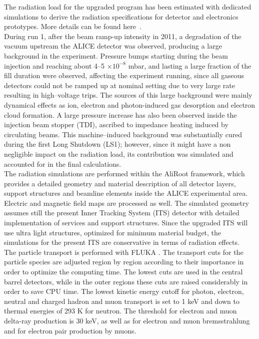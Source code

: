The radiation load for the upgraded program has been estimated with dedicated simulations to derive the radiation specifications for detector and electronics prototypes. More details can be found here~\cite{RadNote}.\\
During {\sc run} 1, after the beam ramp-up intensity in 2011, a degradation of the vacuum upstream the ALICE detector was observed, producing a large background in the experiment. Pressure bumps starting during the beam injection and reaching about 4--5 $\times 10^{-8}$ mbar, and lasting a large fraction of the fill duration were observed, affecting the experiment running, since all gaseous detectors could not be ramped up at nominal setting due to very large rate resulting in high--voltage trips. 
The sources of this large background were mainly dynamical effects as ion, electron and photon-induced gas desorption and electron cloud formation. A large pressure increase has also been observed inside the injection beam stopper (TDI), ascribed to impedance heating induced by circulating beams.
This machine--induced background was substantially cured during the first Long Shutdown (LS1); however, since it might have a non negligible impact on the radiation load, its contribution was simulated and accounted for in the final calculations.\\
The radiation simulations are performed within the AliRoot \cite{AliRoot} framework, which provides a detailed geometry and material description of all detector layers, support structures and beamline elements inside the ALICE experimental area. Electric and magnetic field maps are processed as well. The simulated geometry assumes still the present Inner Tracking System (ITS) detector with detailed implementation of services and support structures. Since the upgraded ITS will use ultra light structures, optimized for minimum material budget, the simulations for the present ITS are conservative in terms of radiation effects.\\
The particle transport is performed with FLUKA \cite{fluka}. The transport cuts for the particle species are adjusted region by region according to their importance in order to optimize the computing time. The lowest cuts are used in the central barrel detectors, while in the outer regions these cuts are raised considerably in order to save CPU time. The lowest kinetic energy cutoff for photon, electron, neutral and charged hadron and muon transport is set to 1 keV and down to thermal energies of 293 K for neutron. The threshold for electron and muon delta-ray production is 30 keV, as well as for electron and muon bremsstrahlung and for electron pair production by muons.\\
